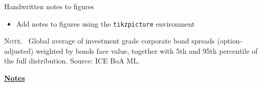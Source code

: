 \documentclass[10pt]{beamer}
\begin{document}
\begin{frame}[t]
	{Handwritten notes to figures}
	\begin{itemize}
		\item Add notes to figures using the \texttt{tikzpicture} environment
	\end{itemize}
	\begin{center}
		\begin{minipage}[b]{.6\textwidth}
			\tiny{{\scshape Note}. \ Global average of investment grade corporate bond spreads (option-adjusted) weighted by bonds face value, together with 5th and 95th percentile of the full distribution. Source: ICE BoA ML.} 
		\end{minipage}
	\end{center}
\end{frame}	
\begin{flushleft}
	\underline{\textbf{Notes}}\setlength{\parskip}{.15cm}\notesize\newline\par
\end{flushleft}

\end{document}
